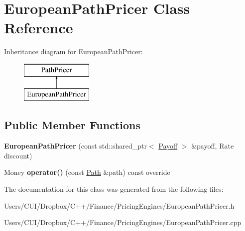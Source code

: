 \hypertarget{class_european_path_pricer}{}\section{European\+Path\+Pricer Class Reference}
\label{class_european_path_pricer}
Inheritance diagram for European\+Path\+Pricer\+:\begin{figure}[H]
\begin{center}
\leavevmode
\includegraphics[height=2.000000cm]{class_european_path_pricer}
\end{center}
\end{figure}
\subsection*{Public Member Functions}
\begin{DoxyCompactItemize}
\item 
\hypertarget{class_european_path_pricer_aa571bb1652a0d7e4f97d3d58e7c8b295}{}\label{class_european_path_pricer_aa571bb1652a0d7e4f97d3d58e7c8b295} 
{\bfseries European\+Path\+Pricer} (const std\+::shared\+\_\+ptr$<$ \hyperlink{class_payoff}{Payoff} $>$ \&payoff, Rate discount)
\item 
\hypertarget{class_european_path_pricer_ac12142089ccdc7fe73ba93d66a7964e6}{}\label{class_european_path_pricer_ac12142089ccdc7fe73ba93d66a7964e6} 
Money {\bfseries operator()} (const \hyperlink{class_path}{Path} \&path) const override
\end{DoxyCompactItemize}


The documentation for this class was generated from the following files\+:\begin{DoxyCompactItemize}
\item 
Users/\+C\+U\+I/\+Dropbox/\+C++/\+Finance/\+Pricing\+Engines/European\+Path\+Pricer.\+h\item 
Users/\+C\+U\+I/\+Dropbox/\+C++/\+Finance/\+Pricing\+Engines/European\+Path\+Pricer.\+cpp\end{DoxyCompactItemize}
